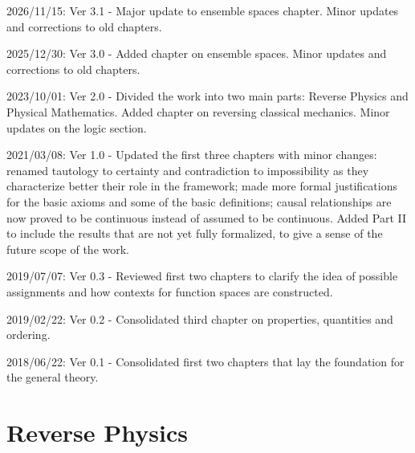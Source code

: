 \documentclass[11pt,letterpaper,fleqn]{memoir} %
\begin{document}
\begin{description}
	\item 2026/11/15: Ver 3.1 - Major update to ensemble spaces chapter. Minor updates and corrections to old chapters.
	\item 2025/12/30: Ver 3.0 - Added chapter on ensemble spaces. Minor updates and corrections to old chapters.
	\item 2023/10/01: Ver 2.0 - Divided the work into two main parts: Reverse Physics and Physical Mathematics. Added chapter on reversing classical mechanics. Minor updates on the logic section.
	\item 2021/03/08: Ver 1.0 - Updated the first three chapters with minor changes: renamed tautology to certainty and contradiction to impossibility as they characterize better their role in the framework; made more formal justifications for the basic axioms and some of the basic definitions; causal relationships are now proved to be continuous instead of assumed to be continuous. Added Part II to include the results that are not yet fully formalized, to give a sense of the future scope of the work.
	\item 2019/07/07: Ver 0.3 - Reviewed first two chapters to clarify the idea of possible assignments and how contexts for function spaces are constructed.
	\item 2019/02/22: Ver 0.2 - Consolidated third chapter on properties, quantities and ordering.
	\item 2018/06/22: Ver 0.1 - Consolidated first two chapters that lay the foundation for the general theory.
\end{description}


\cleardoublepage %

\tableofcontents* %

\cleardoublepage %


\mainmatter

\part{Reverse Physics}
\begingroup
\pagestyle{plain}



\newpage
\endgroup



\end{document}
